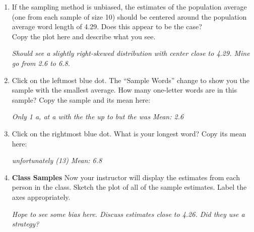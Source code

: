 \begin{enumerate}
\item \label{3000SRSs} If the sampling method is unbiased, the
  estimates of the population average (one from each sample of size
  10) should be centered around the population average word length of
  4.29.
  Does this appear to be the case? \\
  Copy the plot here and describe what you see.
\begin{students}
  \vspace{3cm}
\end{students}    
\begin{key}
   {\it Should see a slightly right-skewed distribution with center
     close to 4.29.  Mine go from 2.6 to 6.8. }
\end{key}

     \item  Click on the leftmost blue dot. The ``Sample Words''
       change to show you the sample with the smallest average. How
       many one-letter words are in this sample?  Copy the sample and
       its mean here:
\begin{students}
  \vspace{1cm}
\end{students}    
\begin{key}
   {\it Only 1 {\sf a, at a with the the up to but the was}   Mean: 2.6}
\end{key}
     \item  Click on the rightmost blue dot. What is your longest
       word?   Copy  its mean here:
\begin{students}
  \vspace{1cm}
\end{students}    
\begin{key}
   {\it {\sf unfortunately} (13) Mean: 6.8}
\end{key}


     \item\label{classPlot} {\bf Class Samples} Now your instructor will
       display the  estimates from each person in the class. 
        Sketch the plot of all of the sample estimates. 
        Label the axes appropriately.       
\begin{students}
  \vspace{4cm}
\end{students}    
\begin{key}
   {\it Hope to see some bias here.  Discuss estimates close to
     4.26. Did they use a strategy?}
\end{key}


\end{enumerate}
